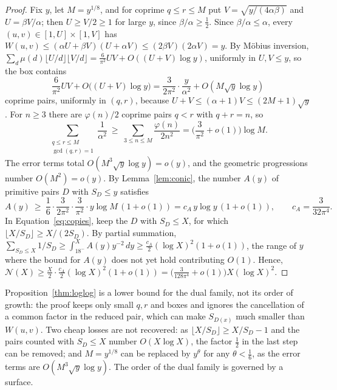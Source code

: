 \documentclass[10pt]{article}
\newcommand{\N}{\mathcal{N}}
\begin{document}
\begin{proof}
Fix $y$, let $M=y^{1/8}$, and for coprime $q\le r\le M$ put $V=\sqrt{y/(4\alpha\beta)}$ and $U=\beta V/\alpha$; then $U\ge V/2\ge1$ for large $y$, since $\beta/\alpha\ge\frac12$. Since $\beta/\alpha\le\alpha$, every $(u,v)\in[1,U]\times[1,V]$ has $W(u,v)\le(\alpha U+\beta V)(U+\alpha V)\le(2\beta V)(2\alpha V)=y$. By M\"obius inversion, $\sum_{d}\mu(d)\lfloor U/d\rfloor\lfloor V/d\rfloor=\frac6{\pi^2}UV+O((U+V)\log y)$, uniformly in $U,V\le y$, so the box contains
\[
  \frac6{\pi^2}UV+O\big((U+V)\log y\big)=\frac3{2\pi^2}\cdot\frac y{\alpha^2}+O(M\sqrt y\log y)
\]
coprime pairs, uniformly in $(q,r)$, because $U+V\le(\alpha+1)V\le(2M+1)\sqrt y$. For $n\ge3$ there are $\varphi(n)/2$ coprime pairs $q<r$ with $q+r=n$, so
\[
  \sum_{\substack{q\le r\le M\\ \gcd(q,r)=1}}\frac1{\alpha^2}\ \ge\ \sum_{3\le n\le M}\frac{\varphi(n)}{2n^2}=\Big(\frac3{\pi^2}+o(1)\Big)\log M .
\]
The error terms total $O(M^3\sqrt y\log y)=o(y)$, and the geometric progressions number $O(M^2)=o(y)$. By Lemma~\ref{lem:conic}, the number $A(y)$ of primitive pairs $D$ with $S_D\le y$ satisfies
\[
  A(y)\ \ge\ \frac16\cdot\frac3{2\pi^2}\cdot\frac3{\pi^2}\cdot y\log M\,(1+o(1))=c_A\,y\log y\,(1+o(1)),\qquad c_A=\frac3{32\pi^4}.
\]
In Equation~\eqref{eq:copies}, keep the $D$ with $S_D\le X$, for which $\lfloor X/S_D\rfloor\ge X/(2S_D)$. By partial summation, $\sum_{S_D\le X}1/S_D\ge\int_{18^-}^XA(y)y^{-2}\,dy\ge\frac{c_A}2(\log X)^2(1+o(1))$, the range of $y$ where the bound for $A(y)$ does not yet hold contributing $O(1)$. Hence, $\N(X)\ge\frac X2\cdot\frac{c_A}2(\log X)^2(1+o(1))=\big(\frac3{128\pi^4}+o(1)\big)X(\log X)^2$.
\end{proof}

Proposition~\ref{thm:loglog} is a lower bound for the dual family, not its order of growth: the proof keeps only small $q,r$ and boxes and ignores the cancellation of a common factor in the reduced pair, which can make $S_{D(x)}$ much smaller than $W(u,v)$. Two cheap losses are not recovered: as $\lfloor X/S_D\rfloor\ge X/S_D-1$ and the pairs counted with $S_D\le X$ number $O(X\log X)$, the factor $\frac12$ in the last step can be removed; and $M=y^{1/8}$ can be replaced by $y^\theta$ for any $\theta<\frac16$, as the error terms are $O(M^3\sqrt y\log y)$. The order of the dual family is governed by a surface.
\end{document}
